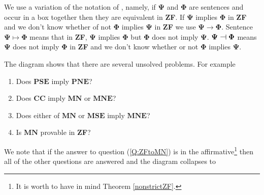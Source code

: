 \documentclass[11pt, reqno]{amsart}
\theoremstyle{definition}
\numberwithin{theorem}{section}
\theoremstyle{definition}
\theoremstyle{definition}
\theoremstyle{definition}
\theoremstyle{definition}
\theoremstyle{definition}
\numberwithin{claim}{section}
\theoremstyle{definition}
\theoremstyle{definition}
\theoremstyle{definition}
\theoremstyle{definition}
\theoremstyle{definition}
\theoremstyle{remboldstyle}
\begin{document}
We use a variation of the notation of \cite{bentley}, namely, if $\mathbf{\Psi}$ and $\mathbf{\Phi}$ are sentences and occur in a box together then they are equivalent in \textbf{ZF}.  If $\mathbf{\Psi}$ implies $\mathbf{\Phi}$ in \textbf{ZF} and we don't know whether of not $\mathbf{\Phi}$ implies $\mathbf{\Psi}$ in \textbf{ZF} we use $\mathbf{\Psi} \to \mathbf{\Phi}$. Sentence $\mathbf{\Psi} \mapsto \mathbf{\Phi}$ means that in \textbf{ZF}, $\mathbf{\Psi}$ implies $\mathbf{\Phi}$ but $\mathbf{\Phi}$ does not imply $\mathbf{\Psi}$.  $\mathbf{\Psi} \ \raisebox{-.2ex}{\rotatebox{90}{\scalebox{1}[1.2]{$\bot$}}}\ \mathbf{\Phi}$ means $\mathbf{\Psi}$ does not imply $\mathbf{\Phi}$ in \textbf{ZF} and we don't know whether or not $\mathbf{\Phi}$ implies $\mathbf{\Psi}$.
\begin{center}
\end{center}
\par 
The diagram shows that there are several unsolved problems.  For example
\begin{enumerate}

\item Does $\mathbf{PSE}$ imply $\mathbf{PNE}$?
\item Does \textbf{CC} imply $\mathbf{MN}$ or $\mathbf{MNE}$?
\item Does either of $\mathbf{MN}$ or $\mathbf{MSE}$ imply $\mathbf{MNE}$?
\item \label{Q:ZFtoMN} Is $\mathbf{MN}$ provable in \textbf{ZF}?
\end{enumerate}
We note that if the answer to question (\ref{Q:ZFtoMN}) is in the affirmative\footnote{It is worth to have in mind Theorem \ref{nonstrictZF}.} then all of the other questions are answered and the diagram collapses to
\end{document}
